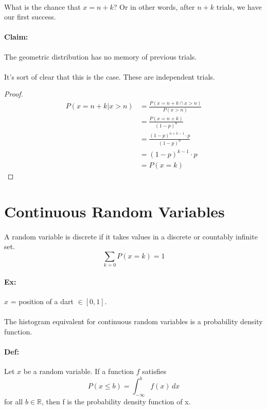 \documentclass{article}
\begin{document}
\paragraph{}What is the chance that $x = n+k$? Or in other words, after $n + k$ trials, we have our first
success.

\paragraph{Claim: }The geometric distribution has no memory of previous trials.
\paragraph{}It's sort of clear that this is the case. These are independent trials. 

\begin{proof}
    \begin{align*}
        P(x = n+k | x > n) &= \frac{P(x = n + k \cap x > n)}{P(x > n)}\\
                           &= \frac{P(x = n + k)}{(1-p)^n}\\
                           &= \frac{(1-p)^{n+k-1} \cdot p}{(1-p)^n} \\
                           &= (1-p)^{k-1}\cdot p\\
                           &= P(x = k)
    \end{align*}
\end{proof}
\section{Continuous Random Variables}
\paragraph{}A random variable is discrete if it takes values in a discrete or countably infinite set.
\begin{equation}
    \sum_{k=0} P(x = k) = 1
\end{equation}
\paragraph{Ex:} $x$ = position of a dart $\in [0,1]$.
\paragraph{} The histogram equivalent for continuous random variables is a probability density function.
\paragraph{Def:} Let $x$ be a random variable. If a function $f$ satisfies
\begin{equation}
    P(x \le b) = \int_{-\infty}^{b} f(x) \,dx
\end{equation}
for all $b \in \mathbb{R}$, then f is the probability density function of x.
\end{document}
